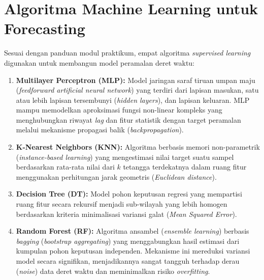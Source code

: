 \section{Algoritma Machine Learning untuk Forecasting}
Sesuai dengan panduan modul praktikum, empat algoritma \textit{supervised learning} digunakan untuk membangun model peramalan deret waktu:
\begin{enumerate}
    \item \textbf{Multilayer Perceptron (MLP):} Model jaringan saraf tiruan umpan maju (\textit{feedforward artificial neural network}) yang terdiri dari lapisan masukan, satu atau lebih lapisan tersembunyi (\textit{hidden layers}), dan lapisan keluaran. MLP mampu memodelkan aproksimasi fungsi non-linear kompleks yang menghubungkan riwayat \textit{lag} dan fitur statistik dengan target peramalan melalui mekanisme propagasi balik (\textit{backpropagation}).
    \item \textbf{K-Nearest Neighbors (KNN):} Algoritma berbasis memori non-parametrik (\textit{instance-based learning}) yang mengestimasi nilai target suatu sampel berdasarkan rata-rata nilai dari $k$ tetangga terdekatnya dalam ruang fitur menggunakan perhitungan jarak geometris (\textit{Euclidean distance}).
    \item \textbf{Decision Tree (DT):} Model pohon keputusan regresi yang mempartisi ruang fitur secara rekursif menjadi sub-wilayah yang lebih homogen berdasarkan kriteria minimalisasi variansi galat (\textit{Mean Squared Error}).
    \item \textbf{Random Forest (RF):} Algoritma ansambel (\textit{ensemble learning}) berbasis \textit{bagging} (\textit{bootstrap aggregating}) yang menggabungkan hasil estimasi dari kumpulan pohon keputusan independen. Mekanisme ini mereduksi variansi model secara signifikan, menjadikannya sangat tangguh terhadap derau (\textit{noise}) data deret waktu dan meminimalkan risiko \textit{overfitting}.
\end{enumerate}

\clearpage

